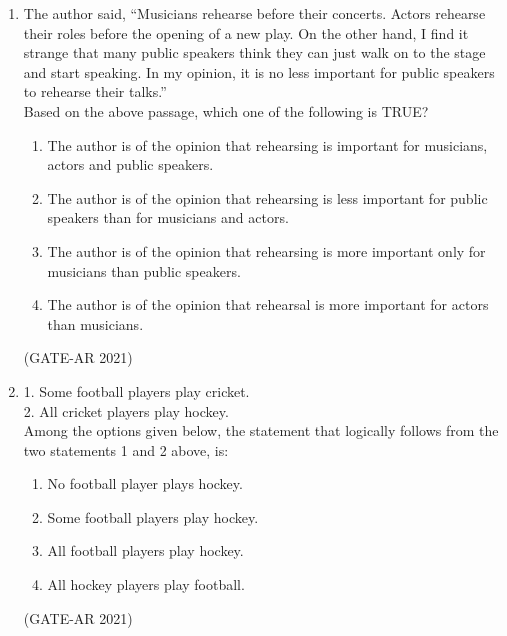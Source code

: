 \documentclass[a4paper,10pt]{article}
\begin{document}
\begin{enumerate}
    \item The author said, ``Musicians rehearse before their concerts. Actors rehearse their roles before the opening of a new play. On the other hand, I find it strange that many public speakers think they can just walk on to the stage and start speaking. In my opinion, it is no less important for public speakers to rehearse their talks.'' \\
    Based on the above passage, which one of the following is TRUE?
    \begin{enumerate}
        \item The author is of the opinion that rehearsing is important for musicians, actors and public speakers.
        \item The author is of the opinion that rehearsing is less important for public speakers than for musicians and actors.
        \item The author is of the opinion that rehearsing is more important only for musicians than public speakers.
        \item The author is of the opinion that rehearsal is more important for actors than musicians.
    \end{enumerate}
    \hfill (GATE-AR 2021)

    \item 1. Some football players play cricket. \\
    2. All cricket players play hockey. \\
    Among the options given below, the statement that logically follows from the two statements 1 and 2 above, is:
    \begin{enumerate}
        \item No football player plays hockey.
        \item Some football players play hockey.
        \item All football players play hockey.
        \item All hockey players play football.
    \end{enumerate}
    \hfill (GATE-AR 2021)


\end{enumerate}
\end{document}
